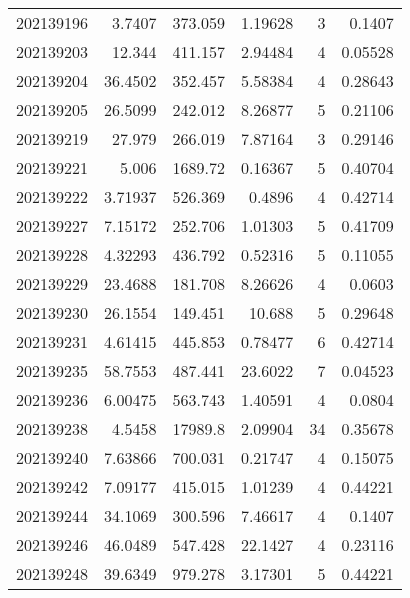 \begin{tabular}{rrrrrr}
 202139196 &          3.7407  &      373.059  &            1.19628 &           3 & 0.1407  \\
 202139203 &         12.344   &      411.157  &            2.94484 &           4 & 0.05528 \\
 202139204 &         36.4502  &      352.457  &            5.58384 &           4 & 0.28643 \\
 202139205 &         26.5099  &      242.012  &            8.26877 &           5 & 0.21106 \\
 202139219 &         27.979   &      266.019  &            7.87164 &           3 & 0.29146 \\
 202139221 &          5.006   &     1689.72   &            0.16367 &           5 & 0.40704 \\
 202139222 &          3.71937 &      526.369  &            0.4896  &           4 & 0.42714 \\
 202139227 &          7.15172 &      252.706  &            1.01303 &           5 & 0.41709 \\
 202139228 &          4.32293 &      436.792  &            0.52316 &           5 & 0.11055 \\
 202139229 &         23.4688  &      181.708  &            8.26626 &           4 & 0.0603  \\
 202139230 &         26.1554  &      149.451  &           10.688   &           5 & 0.29648 \\
 202139231 &          4.61415 &      445.853  &            0.78477 &           6 & 0.42714 \\
 202139235 &         58.7553  &      487.441  &           23.6022  &           7 & 0.04523 \\
 202139236 &          6.00475 &      563.743  &            1.40591 &           4 & 0.0804  \\
 202139238 &          4.5458  &    17989.8    &            2.09904 &          34 & 0.35678 \\
 202139240 &          7.63866 &      700.031  &            0.21747 &           4 & 0.15075 \\
 202139242 &          7.09177 &      415.015  &            1.01239 &           4 & 0.44221 \\
 202139244 &         34.1069  &      300.596  &            7.46617 &           4 & 0.1407  \\
 202139246 &         46.0489  &      547.428  &           22.1427  &           4 & 0.23116 \\
 202139248 &         39.6349  &      979.278  &            3.17301 &           5 & 0.44221 \\

\end{tabular}
